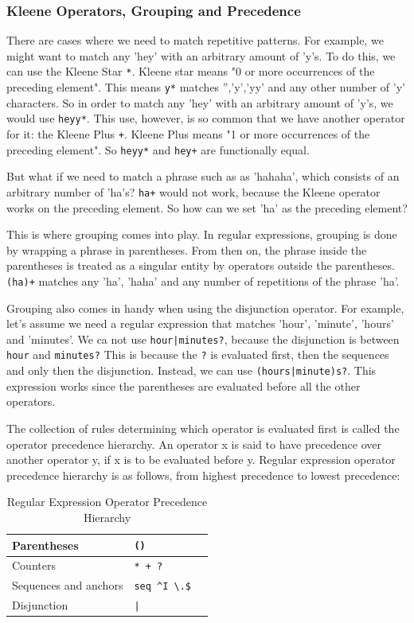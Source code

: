 \subsubsection{Kleene Operators, Grouping and Precedence}

There are cases where we need to match repetitive patterns.
For example, we might want to match any 'hey' with an arbitrary amount of 'y's.
To do this, we can use the Kleene Star \texttt{*}.
Kleene star means "0 or more occurrences of the preceding element".
This means \texttt{y*} matches '','y','yy' and any other number of 'y' characters.
So in order to match any 'hey' with an arbitrary amount of 'y's, we would use \texttt{heyy*}.
This use, however, is so common that we have another operator for it: the Kleene Plus \texttt{+}.
Kleene Plus means "1 or more occurrences of the preceding element".
So \texttt{heyy*} and \texttt{hey+} are functionally equal.

But what if we need to match a phrase such as as 'hahaha', which consists of an arbitrary number of 'ha's?
\texttt{ha+} would not work, because the Kleene operator works on the preceding element.
So how can we set 'ha' as the preceding element?

This is where grouping comes into play.
In regular expressions, grouping is done by wrapping a phrase in parentheses. 
From then on, the phrase inside the parentheses is treated as a singular entity by operators outside the parentheses.
\texttt{(ha)+} matches any 'ha', 'haha' and any number of repetitions of the phrase 'ha'.

Grouping also comes in handy when using the disjunction operator.
For example, let's assume we need a regular expression that matches 'hour', 'minute', 'hours' and 'minutes'.
We ca not use \texttt{hour|minutes?}, because the disjunction is between \texttt{hour} and \texttt{minutes?}
This is because the \texttt{?} is evaluated first, then the sequences and only then the disjunction. 
Instead, we can use \texttt{(hours|minute)s?}. 
This expression works since the parentheses are evaluated before all the other operators.

The collection of rules determining which operator is evaluated first is called the operator precedence hierarchy.
An operator x is said to have precedence over another operator y, if x is to be evaluated before y.
Regular expression operator precedence hierarchy is as follows, from highest precedence to lowest precedence:

\begin{table}[htbp]
  \caption[Regular Expression Operator Precedence Hierarchy]{Regular Expression Operator Precedence Hierarchy}\label{tab:re_oph}
  \centering
  \begin{tabular}{l l l}
    Parentheses&\texttt{()}&\\ \hline 
    Counters&\texttt{* + ?}&\\ \hline 
    Sequences and anchors&\texttt{seq \^{}I \textbackslash.\$}&\\ \hline 
    Disjunction&\texttt{|}&\\ \hline 
  \end{tabular}
\end{table}


